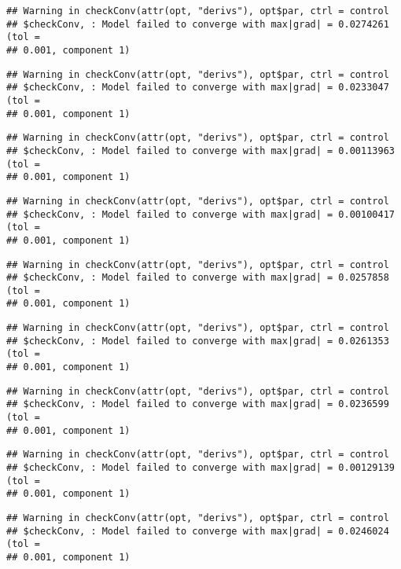 \documentclass[]{article}
\begin{document}
\begin{verbatim}
## Warning in checkConv(attr(opt, "derivs"), opt$par, ctrl = control
## $checkConv, : Model failed to converge with max|grad| = 0.0274261 (tol =
## 0.001, component 1)
\end{verbatim}

\begin{verbatim}
## Warning in checkConv(attr(opt, "derivs"), opt$par, ctrl = control
## $checkConv, : Model failed to converge with max|grad| = 0.0233047 (tol =
## 0.001, component 1)
\end{verbatim}

\begin{verbatim}
## Warning in checkConv(attr(opt, "derivs"), opt$par, ctrl = control
## $checkConv, : Model failed to converge with max|grad| = 0.00113963 (tol =
## 0.001, component 1)
\end{verbatim}

\begin{verbatim}
## Warning in checkConv(attr(opt, "derivs"), opt$par, ctrl = control
## $checkConv, : Model failed to converge with max|grad| = 0.00100417 (tol =
## 0.001, component 1)
\end{verbatim}

\begin{verbatim}
## Warning in checkConv(attr(opt, "derivs"), opt$par, ctrl = control
## $checkConv, : Model failed to converge with max|grad| = 0.0257858 (tol =
## 0.001, component 1)
\end{verbatim}

\begin{verbatim}
## Warning in checkConv(attr(opt, "derivs"), opt$par, ctrl = control
## $checkConv, : Model failed to converge with max|grad| = 0.0261353 (tol =
## 0.001, component 1)
\end{verbatim}

\begin{verbatim}
## Warning in checkConv(attr(opt, "derivs"), opt$par, ctrl = control
## $checkConv, : Model failed to converge with max|grad| = 0.0236599 (tol =
## 0.001, component 1)
\end{verbatim}

\begin{verbatim}
## Warning in checkConv(attr(opt, "derivs"), opt$par, ctrl = control
## $checkConv, : Model failed to converge with max|grad| = 0.00129139 (tol =
## 0.001, component 1)
\end{verbatim}

\begin{verbatim}
## Warning in checkConv(attr(opt, "derivs"), opt$par, ctrl = control
## $checkConv, : Model failed to converge with max|grad| = 0.0246024 (tol =
## 0.001, component 1)
\end{verbatim}
\end{document}
